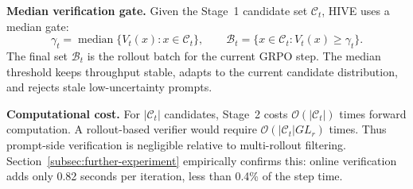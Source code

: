 \textbf{Median verification gate.}
Given the Stage~1 candidate set $\mathcal{C}_t$, HIVE uses a median gate:
\begin{equation}
\label{eq:median_gate}
\gamma_t=\operatorname{median}\{V_t(x):x\in\mathcal{C}_t\},
\qquad
\mathcal{B}_t=\{x\in\mathcal{C}_t:V_t(x)\ge\gamma_t\}.
\end{equation}
The final set $\mathcal{B}_t$ is the rollout batch for the current GRPO step. The median threshold keeps throughput stable, adapts to the current candidate distribution, and rejects stale low-uncertainty prompts.

\textbf{Computational cost.}
For $|\mathcal{C}_t|$ candidates, Stage~2 costs $\mathcal{O}(|\mathcal{C}_t|)$ times forward computation. A rollout-based verifier would require $\mathcal{O}(|\mathcal{C}_t|GL_r)$ times. Thus prompt-side verification is negligible relative to multi-rollout filtering. Section~\ref{subsec:further-experiment} empirically confirms this: online verification adds only 0.82 seconds per iteration, less than 0.4\% of the step time.
\endgroup
